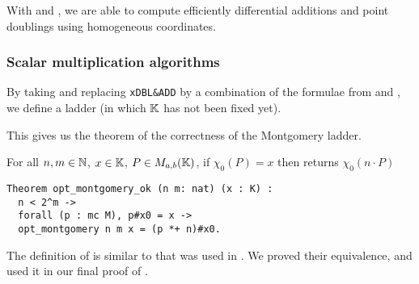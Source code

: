 With  and , we are able to compute efficiently
differential additions and point doublings using homogeneous coordinates.

\subsubsection{Scalar multiplication algorithms}
\label{subsec:ECC-ladder}

By taking  and replacing \texttt{xDBL\&ADD} by a
combination of the formulae from  and ,
we define a ladder  (in which $\mathbb{K}$ has not been fixed yet).

%

This gives us the theorem of the correctness of the Montgomery ladder.
\begin{theorem}
  \label{thm:montgomery-ladder-correct}
  For all $n, m \in \mathbb{N}$, $x \in \mathbb{K}$, $P \in M_{a,b}(\mathbb{K})$,
  if $\chi_0(P) = x$ then  returns $\chi_0(n \cdot P)$
\end{theorem}
\begin{lstlisting}[language=Coq]
Theorem opt_montgomery_ok (n m: nat) (x : K) :
  n < 2^m ->
  forall (p : mc M), p#x0 = x ->
  opt_montgomery n m x = (p *+ n)#x0.
\end{lstlisting}
The definition of  is similar to 
that was used in .
We proved their equivalence, and used it in our
final proof of .


